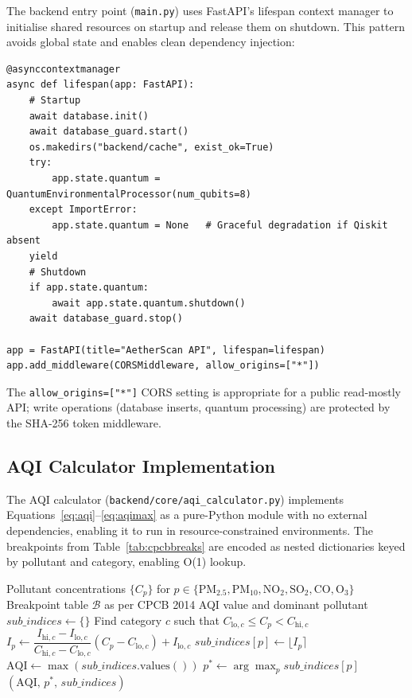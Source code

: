 \documentclass[12pt,a4paper]{article}
\newcommand{\aqi}{\mathrm{AQI}}
\begin{document}
The backend entry point (\texttt{main.py}) uses FastAPI's lifespan context
manager to initialise shared resources on startup and release them on
shutdown. This pattern avoids global state and enables clean dependency
injection:

\begin{lstlisting}[caption={FastAPI lifespan and application initialisation},
                   label=lst:lifespan]
@asynccontextmanager
async def lifespan(app: FastAPI):
    # Startup
    await database.init()
    await database_guard.start()
    os.makedirs("backend/cache", exist_ok=True)
    try:
        app.state.quantum = QuantumEnvironmentalProcessor(num_qubits=8)
    except ImportError:
        app.state.quantum = None   # Graceful degradation if Qiskit absent
    yield
    # Shutdown
    if app.state.quantum:
        await app.state.quantum.shutdown()
    await database_guard.stop()

app = FastAPI(title="AetherScan API", lifespan=lifespan)
app.add_middleware(CORSMiddleware, allow_origins=["*"])
\end{lstlisting}

The \texttt{allow\_origins=["*"]} CORS setting is appropriate for a public
read-mostly API; write operations (database inserts, quantum processing) are
protected by the SHA-256 token middleware.

\subsection{AQI Calculator Implementation}
\label{sec:impl:aqi}

The AQI calculator (\texttt{backend/core/aqi\_calculator.py}) implements
Equations~\ref{eq:aqi}--\ref{eq:aqimax} as a pure-Python module with no
external dependencies, enabling it to run in resource-constrained environments.
The breakpoints from Table~\ref{tab:cpcbbreaks} are encoded as nested
dictionaries keyed by pollutant and category, enabling O(1) lookup.

\begin{algorithm}[H]
\caption{CPCB AQI Calculation}
\label{alg:aqi}
\begin{algorithmic}[1]
\Require Pollutant concentrations $\{C_p\}$ for $p \in \{
         \text{PM}_{2.5}, \text{PM}_{10}, \text{NO}_2,
         \text{SO}_2, \text{CO}, \text{O}_3\}$
\Require Breakpoint table $\mathcal{B}$ as per CPCB 2014
\Ensure  AQI value and dominant pollutant
\State $\mathit{sub\_indices} \leftarrow \{\}$
  \State Find category $c$ such that $C_{\text{lo},c} \leq C_p < C_{\text{hi},c}$ 
  \State $I_p \leftarrow \dfrac{I_{\text{hi},c} - I_{\text{lo},c}}
           {C_{\text{hi},c} - C_{\text{lo},c}} (C_p - C_{\text{lo},c})
           + I_{\text{lo},c}$
  \State $\mathit{sub\_indices}[p] \leftarrow \lfloor I_p \rceil$ 
\EndFor
\State $\aqi \leftarrow \max(\mathit{sub\_indices}.\text{values}())$
\State $p^* \leftarrow \arg\max_p \mathit{sub\_indices}[p]$ 
\State \Return $(\aqi,\, p^*,\, \mathit{sub\_indices})$
\end{algorithmic}
\end{algorithm}
\end{document}
